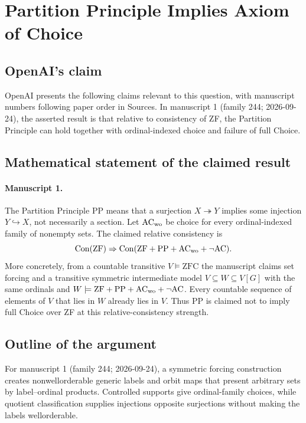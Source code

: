 \documentclass[11pt]{article}
\begin{document}
\section*{Partition Principle Implies Axiom of Choice}

\subsection{OpenAI's claim}
OpenAI presents the following claims relevant to this question, with manuscript numbers following paper order in Sources. In manuscript 1 (family 244; 2026-09-24), the asserted result is that relative to consistency of ZF, the Partition Principle can hold together with ordinal-indexed choice and failure of full Choice.

\subsection{Mathematical statement of the claimed result}
\paragraph{Manuscript 1.}
The Partition Principle $\mathrm{PP}$ means that a surjection $X\twoheadrightarrow Y$ implies some injection $Y\hookrightarrow X$, not necessarily a section. Let $\mathrm{AC}_{\rm wo}$ be choice for every ordinal-indexed family of nonempty sets. The claimed relative consistency is
\[
 \operatorname{Con}(\mathrm{ZF})\Rightarrow
 \operatorname{Con}(\mathrm{ZF}+\mathrm{PP}+\mathrm{AC}_{\rm wo}+\neg\mathrm{AC}).
\]
More concretely, from a countable transitive $V\models\mathrm{ZFC}$ the manuscript claims set forcing and a transitive symmetric intermediate model $V\subseteq W\subseteq V[G]$ with the same ordinals and $W\models\mathrm{ZF}+\mathrm{PP}+\mathrm{AC}_{\rm wo}+\neg\mathrm{AC}$. Every countable sequence of elements of $V$ that lies in $W$ already lies in $V$. Thus PP is claimed not to imply full Choice over ZF at this relative-consistency strength.

\subsection{Outline of the argument}
For manuscript 1 (family 244; 2026-09-24), a symmetric forcing construction creates nonwellorderable generic labels and orbit maps that present arbitrary sets by label--ordinal products. Controlled supports give ordinal-family choices, while quotient classification supplies injections opposite surjections without making the labels wellorderable.
\end{document}
